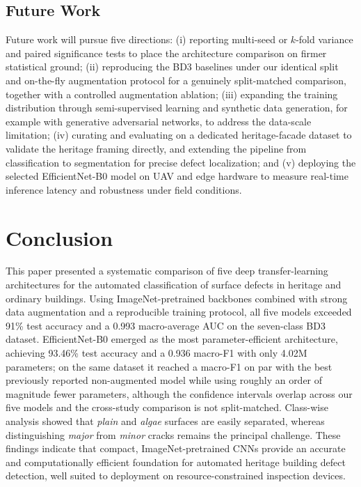 \documentclass[ASNA, twocolumn]{USG}
\begin{document}
\subsection{Future Work}
Future work will pursue five directions: (i) reporting multi-seed or $k$-fold variance and paired significance tests to place the architecture comparison on firmer statistical ground; (ii) reproducing the BD3 baselines under our identical split and on-the-fly augmentation protocol for a genuinely split-matched comparison, together with a controlled augmentation ablation; (iii) expanding the training distribution through semi-supervised learning and synthetic data generation, for example with generative adversarial networks, to address the data-scale limitation; (iv) curating and evaluating on a dedicated heritage-facade dataset to validate the heritage framing directly, and extending the pipeline from classification to segmentation for precise defect localization; and (v) deploying the selected EfficientNet-B0 model on UAV and edge hardware to measure real-time inference latency and robustness under field conditions.

\section{Conclusion}

This paper presented a systematic comparison of five deep transfer-learning architectures for the automated classification of surface defects in heritage and ordinary buildings. Using ImageNet-pretrained backbones combined with strong data augmentation and a reproducible training protocol, all five models exceeded 91\% test accuracy and a 0.993 macro-average AUC on the seven-class BD3 dataset. EfficientNet-B0 emerged as the most parameter-efficient architecture, achieving 93.46\% test accuracy and a 0.936 macro-F1 with only 4.02M parameters; on the same dataset it reached a macro-F1 on par with the best previously reported non-augmented model while using roughly an order of magnitude fewer parameters, although the confidence intervals overlap across our five models and the cross-study comparison is not split-matched. Class-wise analysis showed that \textit{plain} and \textit{algae} surfaces are easily separated, whereas distinguishing \textit{major} from \textit{minor} cracks remains the principal challenge. These findings indicate that compact, ImageNet-pretrained CNNs provide an accurate and computationally efficient foundation for automated heritage building defect detection, well suited to deployment on resource-constrained inspection devices.
\end{document}
